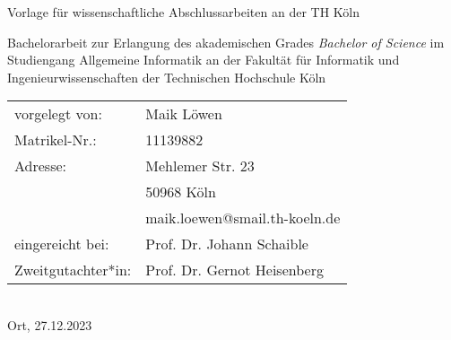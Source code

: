\begin{titlepage}
%
\sffamily%
%
\begin{center}
\end{center}
%
\vfill
%
\begin{huge}
Vorlage für wissenschaftliche Abschlussarbeiten an der TH Köln\\[10mm]
\end{huge}
%
Bachelorarbeit zur Erlangung des akademischen Grades\newline
\emph{Bachelor of Science}\newline
im Studiengang Allgemeine Informatik\newline
an der Fakultät für Informatik und Ingenieurwissenschaften\newline
der Technischen Hochschule Köln
%
\vfill
%
\begin{tabular}{@{}ll}
vorgelegt von: & Maik Löwen\\
Matrikel-Nr.:  & 11139882\\
Adresse:       & Mehlemer Str. 23\\
               & 50968 Köln\\
               & maik.loewen@smail.th-koeln.de\\[5mm]
eingereicht bei:   & Prof. Dr. Johann Schaible\\
Zweitgutachter*in: & Prof. Dr. Gernot Heisenberg
\end{tabular}	
%
\\[10mm]
%
Ort, 27.12.2023%
%
\rmfamily%
%
\end{titlepage}